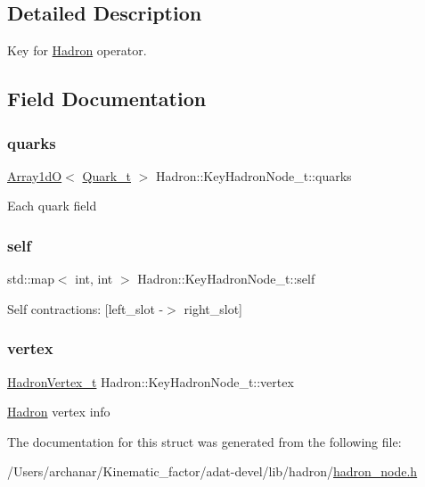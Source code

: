 \subsection{Detailed Description}
Key for \mbox{\hyperlink{namespaceHadron}{Hadron}} operator. 

\subsection{Field Documentation}
\mbox{\label{structHadron_1_1KeyHadronNode__t_a9bc87b9f4f298a6492714dfa94181055}} 
\subsubsection{\texorpdfstring{quarks}{quarks}}
{\footnotesize\ttfamily \mbox{\hyperlink{classADAT_1_1Array1dO}{Array1dO}}$<$ \mbox{\hyperlink{structHadron_1_1KeyHadronNode__t_1_1Quark__t}{Quark\+\_\+t}} $>$ Hadron\+::\+Key\+Hadron\+Node\+\_\+t\+::quarks}

Each quark field \mbox{\label{structHadron_1_1KeyHadronNode__t_a0993d215a770b56b86e8158325dd0538}} 
\subsubsection{\texorpdfstring{self}{self}}
{\footnotesize\ttfamily std\+::map$<$ int, int $>$ Hadron\+::\+Key\+Hadron\+Node\+\_\+t\+::self}

Self contractions\+: \mbox{[}left\+\_\+slot -\/$>$ right\+\_\+slot\mbox{]} \mbox{\label{structHadron_1_1KeyHadronNode__t_a3a89174f6f6abadc81a35f9555530098}} 
\subsubsection{\texorpdfstring{vertex}{vertex}}
{\footnotesize\ttfamily \mbox{\hyperlink{structHadron_1_1HadronVertex__t}{Hadron\+Vertex\+\_\+t}} Hadron\+::\+Key\+Hadron\+Node\+\_\+t\+::vertex}

\mbox{\hyperlink{namespaceHadron}{Hadron}} vertex info 

The documentation for this struct was generated from the following file\+:\begin{DoxyCompactItemize}
\item 
/\+Users/archanar/\+Kinematic\+\_\+factor/adat-\/devel/lib/hadron/\mbox{\hyperlink{adat-devel_2lib_2hadron_2hadron__node_8h}{hadron\+\_\+node.\+h}}\end{DoxyCompactItemize}
